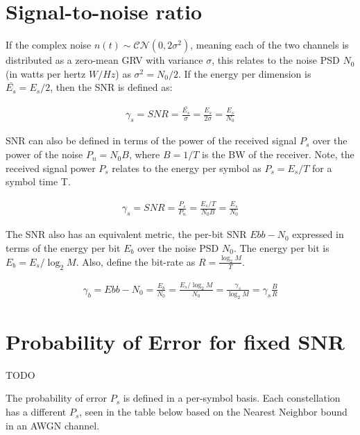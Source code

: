 \documentclass[12pt]{report} %
\begin{document}
\section{Signal-to-noise ratio}


If the complex noise $n(t) \sim \mathcal{C}\mathcal{N}(0,2\sigma^2)$, meaning
each of the two channels is distributed as a zero-mean \gls{GRV} with variance
$\sigma$, this relates to the noise \gls{PSD} $N_0$ (in watts per hertz $W/Hz$)
as $\sigma^2 = N_0/2$. If the energy per dimension is $\bar{E_s} = E_s/2$, then
the \gls{SNR} is defined as:


\begin{align}
  \gamma_s = SNR = \frac{\bar{E_s}}{\sigma} = \frac{E_s}{2\sigma} = \frac{E_s}{N_0}
\end{align}

\Gls{SNR} can also be defined in terms of the power of the received signal $P_s$
over the power of the noise $P_n = N_0 B$, where $B = 1/T$ is the \gls{BW} of
the receiver. Note, the received signal power $P_s$ relates to the energy per
symbol as $P_s = E_s/T$ for a symbol time T.

\begin{align}
  \gamma_s = SNR = \frac{P_s}{P_n}= \frac{E_s/T}{N_0 B} = \frac{E_s}{N_0}
\end{align}


The \gls{SNR} also has an equivalent metric, the per-bit \gls{SNR} $Ebb-N_0$
expressed in terms of the energy per bit $E_b$ over the noise \gls{PSD} $N_0$.
The energy per bit is $E_b = E_s/\log _{2} M$. Also, define the bit-rate as $R =
  \frac{\log _{2} M}{T}$.

\begin{align}
  \gamma_b = Ebb-N_0 = \frac{E_b}{N_0} = \frac{ E_s/\log _{2} M}{N_0} = \frac{\gamma_s}{\log _{2} M} = \gamma_s \frac{B}{R}
\end{align}

\section{Probability of Error for fixed SNR}
TODO

The probability of error $P_s$ is defined in a per-symbol basis. Each constellation has a different $P_s$, seen in the table below based on the Nearest Neighbor bound in an \gls{AWGN} channel.
\end{document}
